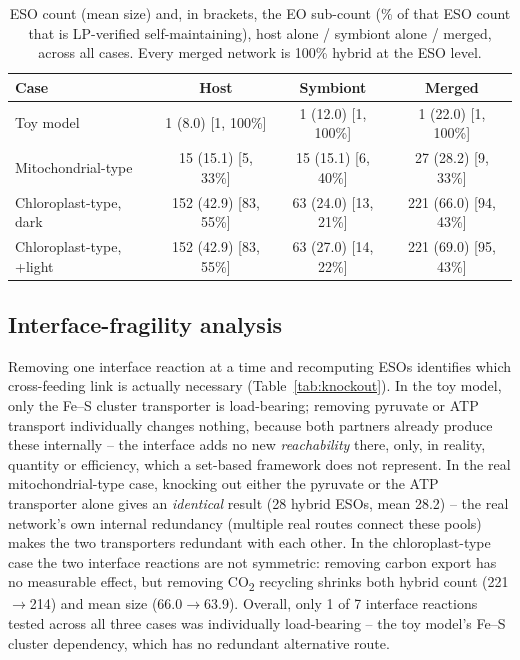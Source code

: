 \documentclass[9pt,twocolumn,twoside]{pnas-new}
\begin{document}
\begin{table}[t]
\centering
\caption{ESO count (mean size) and, in brackets, the EO sub-count (\% of that ESO count that is LP-verified self-maintaining), host alone / symbiont alone / merged, across all cases. Every merged network is 100\% hybrid at the ESO level.}
\label{tab:cases}
\small
\begin{tabular}{lccc}
\toprule
Case & Host & Symbiont & Merged \\
\midrule
Toy model & 1 (8.0) [1, 100\%] & 1 (12.0) [1, 100\%] & 1 (22.0) [1, 100\%] \\
Mitochondrial-type & 15 (15.1) [5, 33\%] & 15 (15.1) [6, 40\%] & 27 (28.2) [9, 33\%] \\
Chloroplast-type, dark & 152 (42.9) [83, 55\%] & 63 (24.0) [13, 21\%] & 221 (66.0) [94, 43\%] \\
Chloroplast-type, +light & 152 (42.9) [83, 55\%] & 63 (27.0) [14, 22\%] & 221 (69.0) [95, 43\%] \\
\bottomrule
\end{tabular}
\end{table}

\subsection*{Interface-fragility analysis}
Removing one interface reaction at a time and recomputing ESOs identifies which cross-feeding link is actually necessary (Table~\ref{tab:knockout}). In the toy model, only the Fe--S cluster transporter is load-bearing; removing pyruvate or ATP transport individually changes nothing, because both partners already produce these internally -- the interface adds no new \emph{reachability} there, only, in reality, quantity or efficiency, which a set-based framework does not represent. In the real mitochondrial-type case, knocking out either the pyruvate or the ATP transporter alone gives an \emph{identical} result (28 hybrid ESOs, mean 28.2) -- the real network's own internal redundancy (multiple real routes connect these pools) makes the two transporters redundant with each other. In the chloroplast-type case the two interface reactions are not symmetric: removing carbon export has no measurable effect, but removing CO\textsubscript{2} recycling shrinks both hybrid count (221$\to$214) and mean size (66.0$\to$63.9). Overall, only 1 of 7 interface reactions tested across all three cases was individually load-bearing -- the toy model's Fe--S cluster dependency, which has no redundant alternative route.
\end{document}
